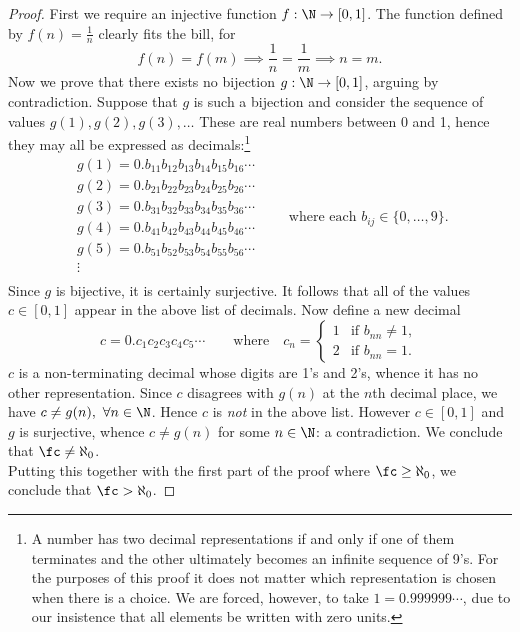 \begin{proof}
First we require an injective function $f:\N\to[0,1]$. The function defined by $f(n)=\frac 1n$ clearly fits the bill, for
\[f(n)=f(m)\implies \frac 1n=\frac 1m\implies n=m.\]
Now we prove that there exists no bijection $g:\N\to[0,1]$, arguing by contradiction. Suppose that $g$ is such a bijection and consider the sequence of values $g(1),g(2),g(3),\ldots$ These are real numbers between 0 and 1, hence they may all be expressed as decimals:\footnote{A number has two decimal representations if and only if one of them terminates and the other ultimately becomes an infinite sequence of 9's. For the purposes of this proof it does not matter which representation is chosen when there is a choice. We are forced, however, to take $1=0.999999\cdots$, due to our insistence that all elements be written with zero units.}
\[\begin{array}{c}
g(1)=0.b_{11}b_{12}b_{13}b_{14}b_{15}b_{16}\cdots\\[2pt]
g(2)=0.b_{21}b_{22}b_{23}b_{24}b_{25}b_{26}\cdots\\[2pt]
g(3)=0.b_{31}b_{32}b_{33}b_{34}b_{35}b_{36}\cdots\\[2pt]
g(4)=0.b_{41}b_{42}b_{43}b_{44}b_{45}b_{46}\cdots\\[2pt]
g(5)=0.b_{51}b_{52}b_{53}b_{54}b_{55}b_{56}\cdots\\[-2pt]
\vdots\\[-8pt]
\end{array}\qquad\text{where each }b_{ij}\in\{0,\ldots,9\}.\]
Since $g$ is bijective, it is certainly surjective. It follows that all of the values $c\in[0,1]$ appear in the above list of decimals. Now define a new decimal
\[c=0.c_1c_2c_3c_4c_5\cdots\qquad\text{where}\quad c_n=\begin{cases}
1&\text{if }b_{nn}\neq 1,\\
2&\text{if }b_{nn}=1.
\end{cases}\]
$c$ is a non-terminating decimal whose digits are 1's and 2's, whence it has no other representation. Since $c$ disagrees with $g(n)$ at the $n$th decimal place, we have $c\neq g(n),\ \forall n\in\N$. Hence $c$ is \emph{not} in the above list. However $c\in[0,1]$ and $g$ is surjective, whence $c\neq g(n)$ for some $n\in\N$: a contradiction. We conclude that $\fc\neq\aleph_0$.\\
Putting this together with the first part of the proof where $\fc\ge\aleph_0$, we conclude that $\fc>\aleph_0$.
\end{proof}

